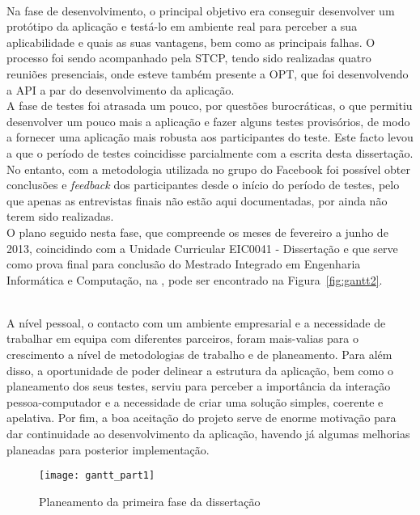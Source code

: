 ~\\Na fase de desenvolvimento, o principal objetivo era conseguir desenvolver um protótipo da aplicação e testá-lo em ambiente real para perceber a sua aplicabilidade e quais as suas vantagens, bem como as principais falhas. O processo foi sendo acompanhado pela STCP, tendo sido realizadas quatro reuniões presenciais, onde esteve também presente a OPT, que foi desenvolvendo a API a par do desenvolvimento da aplicação.
\\A fase de testes foi atrasada um pouco, por questões burocráticas, o que permitiu desenvolver um pouco mais a aplicação e fazer alguns testes provisórios, de modo a fornecer uma aplicação mais robusta aos participantes do teste. Este facto levou a que o período de testes coincidisse parcialmente com a escrita desta dissertação. No entanto, com a metodologia utilizada no grupo do Facebook foi possível obter conclusões e \emph{feedback} dos participantes desde o início do período de testes, pelo que apenas as entrevistas finais não estão aqui documentadas, por ainda não terem sido realizadas.
\\O plano seguido nesta fase, que compreende os meses de fevereiro a junho de 2013, coincidindo com a Unidade Curricular EIC0041 - Dissertação e que serve como prova final para conclusão do Mestrado Integrado em Engenharia Informática e Computação, na \Feup, pode ser encontrado na Figura~\ref{fig:gantt2}.

~\\A nível pessoal, o contacto com um ambiente empresarial e a necessidade de trabalhar em equipa com diferentes parceiros, foram mais-valias para o crescimento a nível de metodologias de trabalho e de planeamento. Para além disso, a oportunidade de poder delinear a estrutura da aplicação, bem como o planeamento dos seus testes, serviu para perceber a importância da interação pessoa-computador e a necessidade de criar uma solução simples, coerente e apelativa. Por fim, a boa aceitação do projeto serve de enorme motivação para dar continuidade ao desenvolvimento da aplicação, havendo já algumas melhorias planeadas para posterior implementação.

\begin{figure}[t]
  \begin{center}
    \leavevmode
    \texttt{[image: gantt\_part1]}
    \caption{Planeamento da primeira fase da dissertação}
    \label{fig:gantt1}
  \end{center}
\end{figure}

